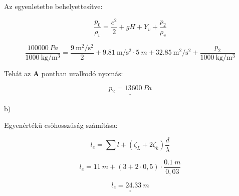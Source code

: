 Az egyenletetbe behelyettesítve:

\begin{equation}
\frac{p_0}{\rho_v}=\frac{c^2}{2}+gH+Y_v+\frac{p_2}{\rho_v}
\end{equation}

\begin{equation}
\frac{
	\SI{100 000}{Pa}
}{
\SI{1000}{\kilogram\per\meter\cubed}
}
=
\frac{{\SI{9}{\meter\squared\per\second\squared}}
}{
2
}
+
\SI{9,81}{\meter\per\second\squared}
\cdot
\SI{5}{m}
+
\SI{32,85}{\meter\squared\per\second\squared}
+
\frac{p_2}{\SI{1000}{\kilogram\per\meter\cubed}}
\end{equation}

Tehát az \textbf{A} pontban uralkodó nyomás:

\begin{equation}
\underline{\underline{p_2=\SI{13 600}{Pa}}}
\end{equation}

\noindent b)

Egyenértékű csőhosszúság számítása:

\begin{equation}
l_e=\sum{l}+(\zeta_L+2\zeta_k)\frac{d}{\lambda}
\end{equation}

\begin{equation}
l_e=\SI{11}{m}+(3+2\cdot0,5)\cdot\frac{\SI{0,1}{m}}{0,03}
\end{equation}

\begin{equation}
\underline{\underline{l_e=\SI{24,33}{m}}}
\end{equation}